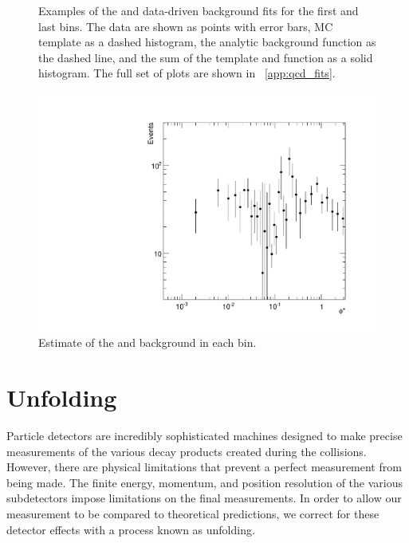 \begin{figure}[!htbp]
\begin{subfigure}[b]{\SideBySidePlotWidth}
        \caption{}
        \label{fig:qcd_fit_example_34}
    \end{subfigure}
    \caption[
       Examples of the \QCDjets and \wjets data-driven background fits.
    ]{
       Examples of the \QCDjets and \wjets data-driven background fits for the
       first and last \phistar bins. The data are shown as points with error
       bars, MC template as a dashed histogram, the analytic background
       function as the dashed line, and the sum of the template and function as
       a solid histogram. The full set of plots are shown in
       \APP~\ref{app:qcd_fits}.
    }
    \label{fig:qcd_example_fits}
\end{figure}

\begin{figure}[!htbp]
    \centering
    \includegraphics[width=\textwidth]{figures/qcd_phistar.pdf}
    \caption{
        Estimate of the \QCDjets and \wjets background in each \phistar bin.
    }
    \label{fig:qcd_phistar}
\end{figure}

\section{Unfolding}
\label{sec:unfolding}

Particle detectors are incredibly sophisticated machines designed to make
precise measurements of the various decay products created during the
collisions. However, there are physical limitations that prevent a perfect
measurement from being made. The finite energy, momentum, and position
resolution of the various subdetectors impose limitations on the final
measurements. In order to allow our measurement to be compared to theoretical
predictions, we correct for these detector effects with a process known as
unfolding.

